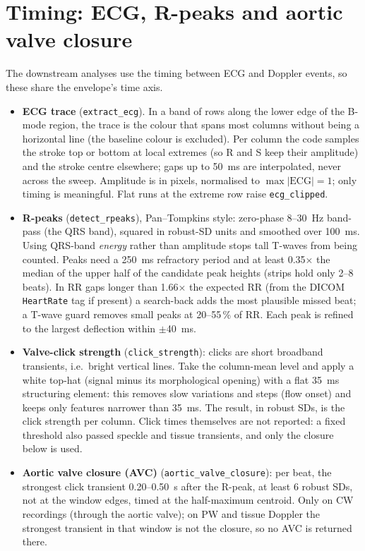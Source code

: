 \documentclass[11pt,a4paper]{article}
\newcommand{\code}[1]{\texttt{\small #1}}
\begin{document}
\section{Timing: ECG, R-peaks and aortic valve closure}
\label{sec:ecg}
The downstream analyses use the timing between ECG and Doppler events, so these share the envelope's time axis.
\begin{itemize}
\item \textbf{ECG trace} (\code{extract\_ecg}). In a band of rows along the lower edge of the B-mode region, the
trace is the colour that spans most columns without being a horizontal line (the baseline colour is excluded).
Per column the code samples the stroke top or bottom at local extremes (so R and S keep their amplitude) and the
stroke centre elsewhere; gaps up to 50~ms are interpolated, never across the sweep. Amplitude is in pixels,
normalised to $\max|\mathrm{ECG}| = 1$; only timing is meaningful. Flat runs at the extreme row raise
\code{ecg\_clipped}.
\item \textbf{R-peaks} (\code{detect\_rpeaks}), Pan--Tompkins style: zero-phase 8--30~Hz band-pass (the QRS band),
squared in robust-SD units and smoothed over 100~ms. Using QRS-band \emph{energy} rather than amplitude stops tall
T-waves from being counted. Peaks need a 250~ms refractory period and at least 0.35$\times$ the median of the upper
half of the candidate peak heights (strips hold only 2--8 beats). In RR gaps longer than 1.66$\times$ the expected RR
(from the DICOM \code{HeartRate} tag if present) a search-back adds the most plausible missed beat; a T-wave guard
removes small peaks at 20--55\,\% of RR. Each peak is refined to the largest deflection within $\pm$40~ms.
\item \textbf{Valve-click strength} (\code{click\_strength}): clicks are short broadband transients, i.e.\ bright
vertical lines. Take the column-mean level and apply a white top-hat (signal minus its morphological opening) with a
flat 35~ms structuring element: this removes slow variations and steps (flow onset) and keeps only features narrower
than 35~ms. The result, in robust SDs, is the click strength per column. Click times themselves are not reported:
a fixed threshold also passed speckle and tissue transients, and only the closure below is used.
\item \textbf{Aortic valve closure (AVC)} (\code{aortic\_valve\_closure}): per beat, the strongest click transient
0.20--0.50~s after the R-peak, at least 6 robust SDs, not at the window edges, timed at the half-maximum centroid.
Only on CW recordings (through the aortic valve); on PW and tissue Doppler the strongest transient in that window is
not the closure, so no AVC is returned there.
\end{itemize}
\end{document}
